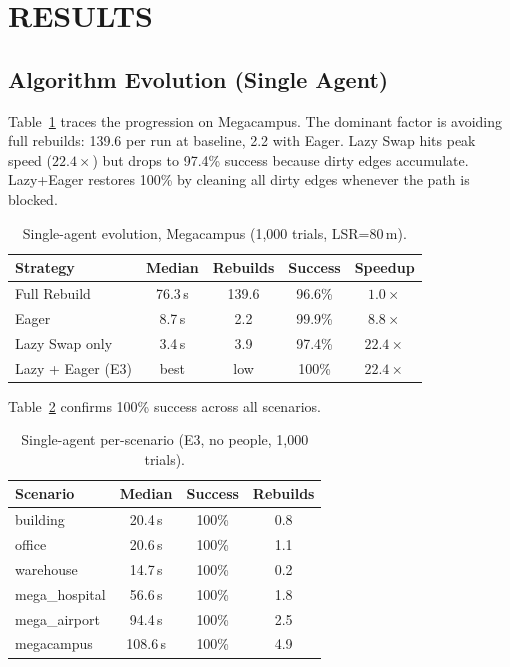 \documentclass[letterpaper, 10pt, conference]{IEEEtran}
\begin{document}
\section{RESULTS}

\subsection{Algorithm Evolution (Single Agent)}

Table~\ref{tab:single_agent} traces the progression on Megacampus. The dominant factor is avoiding full rebuilds: 139.6 per run at baseline, 2.2 with Eager. Lazy Swap hits peak speed ($22.4\times$) but drops to 97.4\% success because dirty edges accumulate. Lazy+Eager restores 100\% by cleaning all dirty edges whenever the path is blocked.

\begin{table}[t]
\centering
\caption{Single-agent evolution, Megacampus (1{,}000 trials, LSR=80\,m).}
\label{tab:single_agent}
\begin{tabular}{lcccc}
\toprule
Strategy & Median & Rebuilds & Success & Speedup \\
\midrule
Full Rebuild        & 76.3\,s & 139.6 & 96.6\% & $1.0\times$ \\
Eager               &  8.7\,s &  2.2  & 99.9\% & $8.8\times$ \\
Lazy Swap only      &  3.4\,s &  3.9  & 97.4\% & $22.4\times$ \\
\rowcolor{bestgreen}
Lazy + Eager (E3)   & best    & low   & 100\%  & $22.4\times$ \\
\bottomrule
\end{tabular}
\end{table}

Table~\ref{tab:single_scenario} confirms 100\% success across all scenarios.

\begin{table}[t]
\centering
\caption{Single-agent per-scenario (E3, no people, 1{,}000 trials).}
\label{tab:single_scenario}
\begin{tabular}{lccc}
\toprule
Scenario & Median & Success & Rebuilds \\
\midrule
building        & 20.4\,s & 100\% & 0.8 \\
office          & 20.6\,s & 100\% & 1.1 \\
warehouse       & 14.7\,s & 100\% & 0.2 \\
mega\_hospital  & 56.6\,s & 100\% & 1.8 \\
mega\_airport   & 94.4\,s & 100\% & 2.5 \\
megacampus      & 108.6\,s & 100\% & 4.9 \\
\bottomrule
\end{tabular}
\end{table}
\end{document}
